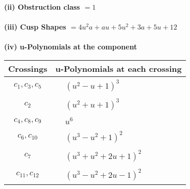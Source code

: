 \documentclass[1p]{elsarticle_modified}
\theoremstyle{definition}
\begin{document}
\flushleft \textbf{(ii) Obstruction class $= 1$}\\~\\
\flushleft \textbf{(iii) Cusp Shapes $= 4 u^2 a+a u+5 u^2+3 a+5 u+12$}\\~\\
\newpage\renewcommand{\arraystretch}{1}
\flushleft \textbf{(iv) u-Polynomials at the component}\newline \\
\begin{tabular}{m{50pt}|m{274pt}}
Crossings & \hspace{64pt}u-Polynomials at each crossing \\
\hline $$\begin{aligned}c_{1},c_{3},c_{5}\end{aligned}$$&$\begin{aligned}
&(u^2- u+1)^3
\end{aligned}$\\
\hline $$\begin{aligned}c_{2}\end{aligned}$$&$\begin{aligned}
&(u^2+u+1)^3
\end{aligned}$\\
\hline $$\begin{aligned}c_{4},c_{8},c_{9}\end{aligned}$$&$\begin{aligned}
&u^6
\end{aligned}$\\
\hline $$\begin{aligned}c_{6},c_{10}\end{aligned}$$&$\begin{aligned}
&(u^3- u^2+1)^2
\end{aligned}$\\
\hline $$\begin{aligned}c_{7}\end{aligned}$$&$\begin{aligned}
&(u^3+u^2+2 u+1)^2
\end{aligned}$\\
\hline $$\begin{aligned}c_{11},c_{12}\end{aligned}$$&$\begin{aligned}
&(u^3- u^2+2 u-1)^2
\end{aligned}$\\
\hline
\end{tabular}\\~\\
\end{document}
